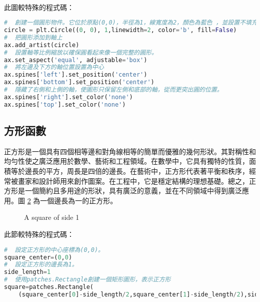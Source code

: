 \documentclass[12pt, a4paper]{article}
\begin{document}
\begin{enumerate}
\begin{figure}[h]
    \label{fig:circle_3}
\end{figure}\\
此圖較特殊的程式碼：
\begin{lstlisting}[language=Python]
#  創建一個圓形物件。它位於原點(0,0)，半徑為1，線寬度為2，顏色為藍色 ，並設置不填充內部(fill=False)。
circle = plt.Circle((0, 0), 1,linewidth=2, color='b', fill=False)
#  把圓形添加到軸上
ax.add_artist(circle)
#  設置軸等比例縮放以確保圓看起來像一個完整的圓形。
ax.set_aspect('equal', adjustable='box')
#  將左邊及下方的軸位置設置為中心
ax.spines['left'].set_position('center')
ax.spines['bottom'].set_position('center')
#  隱藏了右側和上側的軸，使圖形只保留左側和底部的軸，從而更突出圓的位置。
ax.spines['right'].set_color('none')
ax.spines['top'].set_color('none')
\end{lstlisting}
\end{enumerate}
\subsection{方形函數}
正方形是一個具有四個相等邊和對角線相等的簡單而優雅的幾何形狀。其對稱性和均勻性使之廣泛應用於數學、藝術和工程領域。在數學中，它具有獨特的性質，面積等於邊長的平方，周長是四倍的邊長。在藝術中，正方形代表著平衡和秩序，經常被畫家和設計師用來創作圖案。在工程中，它是穩定結構的理想基礎。總之，正方形是一個簡約且多用途的形狀，具有廣泛的意義，並在不同領域中得到廣泛應用。圖 \ref{fig:square} 為一個邊長為一的正方形。
\begin{figure}[H]
    \caption{A square of side 1}
    \label{fig:square}
\end{figure}
此節較特殊的程式碼：
\begin{lstlisting}[language=Python]
#  設定正方形的中心座標為(0,0)。
square_center=(0,0)  
#  設定正方形的邊長為1。
side_length=1
#  使用patches.Rectangle創建一個矩形圖形，表示正方形
square=patches.Rectangle(
    (square_center[0]-side_length/2,square_center[1]-side_length/2),side_length,side_length,linewidth=2,edgecolor='b',facecolor='none')
\end{lstlisting}
\end{document}
